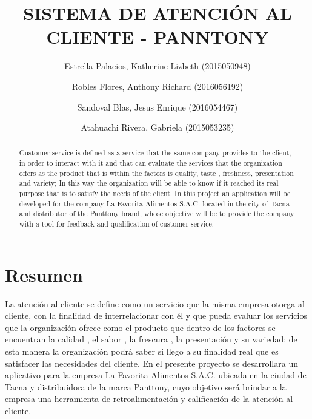 \documentclass[preprint,12pt]{elsarticle}
\begin{document}
	
	\begin{frontmatter}

		\title{\huge  SISTEMA DE ATENCIÓN AL CLIENTE - PANNTONY}
		
		\author{Estrella Palacios, Katherine Lizbeth      (2015050948)}		
		\author{Robles Flores, Anthony Richard	(2016056192)}
		\author{Sandoval Blas, Jesus Enrique           	(2016054467)}
		\author{Atahuachi Rivera, Gabriela            	(2015053235)}
		
		\address{Tacna, Perú}
		
		\begin{abstract}
Customer service is defined as a service that the same company provides to the client, in order to interact with it and that can evaluate the services that the organization offers as the product that is within the factors is quality, taste , freshness, presentation and variety; In this way the organization will be able to know if it reached its real purpose that is to satisfy the needs of the client. In this project an application will be developed for the company La Favorita Alimentos S.A.C. located in the city of Tacna and distributor of the Panttony brand, whose objective will be to provide the company with a tool for feedback and qualification of customer service.
		\end{abstract}
\end{frontmatter}

\section{Resumen}
La atención al cliente se define como un servicio que la misma empresa otorga al cliente, con la finalidad de interrelacionar con él y que pueda evaluar los servicios que la organización ofrece como el producto que dentro de los factores se encuentran la calidad , el sabor , la frescura , la presentación y su variedad; de esta  manera la organización podrá saber si llego a su finalidad real que es satisfacer las necesidades del cliente. En el presente proyecto se desarrollara un aplicativo para la empresa La Favorita Alimentos S.A.C. ubicada en la ciudad de Tacna y distribuidora de la marca Panttony, cuyo objetivo será brindar a la empresa una herramienta de retroalimentación y calificación de la atención al cliente.
\end{document}
